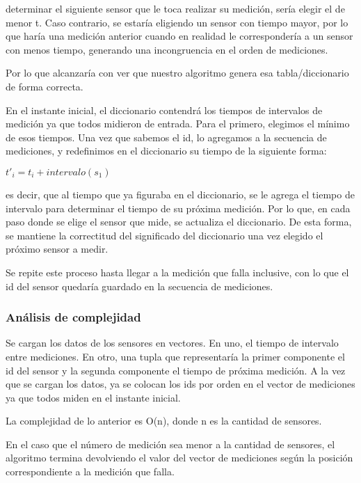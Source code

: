 \quad determinar el siguiente sensor que le toca realizar su medici\'on, ser\'ia elegir el de menor t. Caso contrario, se estar\'ia eligiendo un sensor con tiempo mayor, por lo que har\'ia una medici\'on anterior cuando en realidad le corresponder\'ia a un sensor con menos tiempo, generando una incongruencia en el orden de mediciones.

\quad Por lo que alcanzar\'ia con ver que nuestro algoritmo genera esa tabla/diccionario de forma correcta.

\quad En el instante inicial, el diccionario contendr\'a los tiempos de intervalos de medici\'on ya que todos midieron de entrada. Para el primero, elegimos el m\'inimo de esos tiempos. Una vez que sabemos el id, lo agregamos a la secuencia de mediciones, y redefinimos en el diccionario su tiempo de la siguiente forma:

$ t'_{i} = t_{i} + intervalo(s_1) $

\quad es decir, que al tiempo que ya figuraba en el diccionario, se le agrega el tiempo de intervalo para determinar el tiempo de su pr\'oxima medici\'on. Por lo que, en cada paso donde se elige el sensor que mide, se actualiza el diccionario. De esta forma, se mantiene la correctitud del significado del diccionario una vez elegido el pr\'oximo sensor a medir.

\quad Se repite este proceso hasta llegar a la medici\'on que falla inclusive, con lo que el id del sensor quedar\'ia guardado en la secuencia de mediciones.


\subsubsection{An\'alisis de complejidad}

\quad Se cargan los datos de los sensores en vectores. En uno, el tiempo de intervalo entre mediciones. En otro, una tupla que representar\'ia la primer componente el id del sensor y la segunda componente el tiempo de pr\'oxima medici\'on. A la vez que se cargan los datos, ya se colocan los ids por orden en el vector de mediciones ya que todos miden en el instante inicial.

\quad La complejidad de lo anterior es O(n), donde n es la cantidad de sensores.

\quad En el caso que el n\'umero de medici\'on sea menor a la cantidad de sensores, el algoritmo termina devolviendo el valor del vector de mediciones seg\'un la posici\'on correspondiente a la medici\'on que falla.

